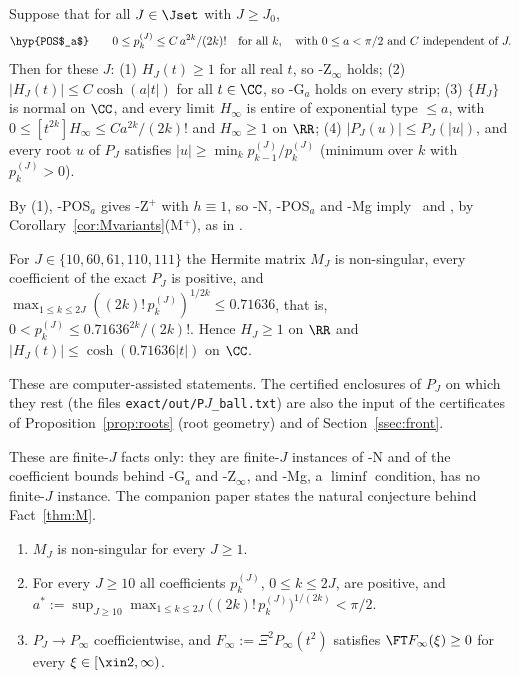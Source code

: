 \begin{fact}\label{prop:POS}
Suppose that for all $J\in\Jset$ with $J\ge J_0$,
\[
\hyp{POS$_a$}\qquad 0\le p_k^{(J)}\le C\,a^{2k}/(2k)!\quad\text{for all }k,\quad\text{with }0\le a<\pi/2\text{ and }C\text{ independent of }J.
\]
Then for these $J$: \textup{(1)} $H_J(t)\ge1$ for all real $t$, so \hyp{Z$_\infty$} holds;
\textup{(2)} $\lvert H_J(t)\rvert\le C\cosh(a\lvert t\rvert)$ for all $t\in\CC$, so \hyp{G$_a$} holds on every strip;
\textup{(3)} $\{H_J\}$ is normal on $\CC$, and every limit $H_\infty$ is entire of exponential type $\le a$, with
$0\le[t^{2k}]H_\infty\le Ca^{2k}/(2k)!$ and $H_\infty\ge1$ on $\RR$; \textup{(4)} $\lvert P_J(u)\rvert\le P_J(\lvert u\rvert)$, and
every root $u$ of $P_J$ satisfies $\lvert u\rvert\ge\min_kp_{k-1}^{(J)}/p_k^{(J)}$ (minimum over $k$ with $p_k^{(J)}>0$).
\end{fact}

By (1), \hyp{POS$_a$} gives \hyp{Z$^+$} with $h\equiv1$, so \hyp{N}, \hyp{POS$_a$} and \hyp{Mg} imply \condS\ and \condU, by
Corollary~\ref{cor:Mvariants}(M$^+$), as in \cite[Remark~4.10(a)]{PaperI}.

\begin{fact}\label{thm:finiteJ}
For $J\in\{10,60,61,110,111\}$ the Hermite matrix $M_J$ is non-singular, every coefficient of the exact $P_J$ is positive, and
$\max_{1\le k\le2J}((2k)!\,p_k^{(J)})^{1/2k}\le0.71636$, that is, $0<p_k^{(J)}\le0.71636^{2k}/(2k)!$. Hence $H_J\ge1$ on $\RR$ and
$\lvert H_J(t)\rvert\le\cosh(0.71636\lvert t\rvert)$ on $\CC$.
\end{fact}

These are computer-assisted statements. The certified enclosures of $P_J$ on which they rest (the files
\nolinkurl{exact/out/P}$J$\nolinkurl{_ball.txt}) are also the input of the certificates of Proposition~\ref{prop:roots} (root geometry) and of
Section~\ref{ssec:front}.

These are finite-$J$ facts only: they are finite-$J$ instances of \hyp{N} and of the coefficient bounds behind \hyp{G$_a$}
and \hyp{Z$_\infty$}, and \hyp{Mg}, a $\liminf$ condition, has no finite-$J$ instance. The companion paper states the natural
conjecture behind Fact~\ref{thm:M}.

\begin{conjecture}\label{conj:PPmagic}
\begin{enumerate}[label=\textup{(\alph*)}]
\item $M_J$ is non-singular for every $J\ge1$.
\item For every $J\ge10$ all coefficients $p^{(J)}_k$, $0\le k\le2J$, are positive, and
$a^*:=\sup_{J\ge10}\max_{1\le k\le2J}\bigl((2k)!\,p^{(J)}_k\bigr)^{1/(2k)}<\pi/2$.
\item $P_J\to P_\infty$ coefficientwise, and $F_\infty:=\Xi^2P_\infty(t^2)$ satisfies $\FT F_\infty(\xi)\ge0$ for every
$\xi\in[\xin2,\infty)$.
\end{enumerate}
\end{conjecture}

